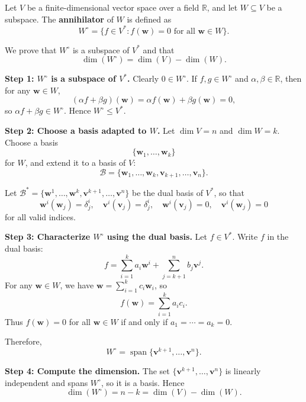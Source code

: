 \documentclass[11pt]{article}
\begin{document}
Let $V$ be a finite-dimensional vector space over a field $\mathbb{R}$, and let $W \subseteq V$ be a subspace.  
The \textbf{annihilator} of $W$ is defined as
\[
W^\circ = \{ f \in V^* : f(\mathbf{w}) = 0 \text{ for all } \mathbf{w} \in W \}.
\]

We prove that $W^\circ$ is a subspace of $V^*$ and that
\[
\dim(W^\circ) = \dim(V) - \dim(W).
\]

\medskip

\noindent\textbf{Step 1: $W^\circ$ is a subspace of $V^*$.}  
Clearly $0 \in W^\circ$. If $f,g \in W^\circ$ and $\alpha,\beta \in \mathbb{R}$, then for any $\mathbf{w} \in W$,
\[
(\alpha f + \beta g)(\mathbf{w}) = \alpha f(\mathbf{w}) + \beta g(\mathbf{w}) = 0,
\]
so $\alpha f + \beta g \in W^\circ$. Hence $W^\circ \leq V^*$.

\medskip

\noindent\textbf{Step 2: Choose a basis adapted to $W$.}  
Let $\dim V = n$ and $\dim W = k$. Choose a basis
\[
\{ \mathbf{w}_1, \dots, \mathbf{w}_k \}
\]
for $W$, and extend it to a basis of $V$:
\[
\mathcal{B} = \{ \mathbf{w}_1, \dots, \mathbf{w}_k, \mathbf{v}_{k+1}, \dots, \mathbf{v}_n \}.
\]

Let $\mathcal{B}^* = \{ \mathbf{w}^1, \dots, \mathbf{w}^k, \mathbf{v}^{k+1}, \dots, \mathbf{v}^n \}$ be the dual basis of $V^*$, so that
\[
\mathbf{w}^i(\mathbf{w}_j) = \delta^i_j, \quad
\mathbf{v}^i(\mathbf{v}_j) = \delta^i_j, \quad
\mathbf{w}^i(\mathbf{v}_j) = 0, \quad
\mathbf{v}^i(\mathbf{w}_j) = 0
\]
for all valid indices.

\medskip

\noindent\textbf{Step 3: Characterize $W^\circ$ using the dual basis.}  
Let $f \in V^*$. Write $f$ in the dual basis:
\[
f = \sum_{i=1}^k a_i \mathbf{w}^i + \sum_{j=k+1}^n b_j \mathbf{v}^j.
\]
For any $\mathbf{w} \in W$, we have $\mathbf{w} = \sum_{i=1}^k c_i \mathbf{w}_i$, so
\[
f(\mathbf{w}) = \sum_{i=1}^k a_i c_i.
\]
Thus $f(\mathbf{w}) = 0$ for all $\mathbf{w} \in W$ if and only if $a_1 = \cdots = a_k = 0$.

Therefore,
\[
W^\circ = \operatorname{span}\{ \mathbf{v}^{k+1}, \dots, \mathbf{v}^n \}.
\]

\medskip

\noindent\textbf{Step 4: Compute the dimension.}  
The set $\{ \mathbf{v}^{k+1}, \dots, \mathbf{v}^n \}$ is linearly independent and spans $W^\circ$, so it is a basis. Hence
\[
\dim(W^\circ) = n - k = \dim(V) - \dim(W).
\]
\end{document}

